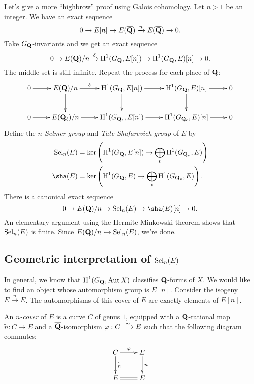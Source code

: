 Let's give a more ``highbrow'' proof using Galois cohomology. Let $n>1$ be an 
integer. We have an exact sequence 
\[
  0 \to E[n] \to E(\overline{\mathbf{Q}}) \xrightarrow n E(\overline{\mathbf{Q}}) \to 0 .
\]
Take $G_{\mathbf{Q}}$-invariants and we get an exact sequence 
\[
  0 \to E(\mathbf{Q})/n \xrightarrow\delta \operatorname{H}^1(G_{\mathbf{Q}},E[n]) \to \operatorname{H}^1(G_{\mathbf{Q}},E)[n] \to 0 .
\]
The middle set is still infinite. Repeat the process for each place  of $\mathbf{Q}$:
\[\xymatrix{
  0 \ar[r] 
    & E(\dQ)/n \ar[r]^-\delta \ar[d] 
    & \h^1(G_\dQ,E[n]) \ar[r] \ar[d] 
    & \h^1(G_\dQ,E)[n] \ar[r] \ar[d] 
    & 0 \\
  0 \ar[r] 
    & E(\dQ_\ell)/n \ar[r] 
    & \h^1(G_{\dQ_\ell},E[n]) \ar[r] 
    & \h^1(G_{\dQ_\ell},E)[n] \ar[r] 
    & 0 
}\]
Define the \emph{$n$-Selmer group} and \emph{Tate-Shafarevich group} of $E$ by 
\begin{align*}
  \selmer_n(E) 
    &= \ker\left(\h^1(G_\dQ,E[n]) \to \bigoplus_v \h^1(G_{\dQ_v},E)\right) \\
  \sha(E) 
    &= \ker\left(\h^1(G_\dQ,E) \to \bigoplus_v \h^1(G_{\dQ_v},E)\right) .
\end{align*}
There is a canonical exact sequence 
\[
  0 \to E(\dQ)/n \to \selmer_n(E) \to \sha(E)[n] \to 0 .
\]
An elementary argument using the Hermite-Minkowski theorem shows that 
$\operatorname{Sel}_n(E)$ is finite. Since $E(\mathbf{Q})/n\hookrightarrow \operatorname{Sel}_n(E)$, we're 
done. 





\subsection{Geometric interpretation of \texorpdfstring{$\operatorname{Sel}_n(E)$}{SelnE}}

In general, we know that $\operatorname{H}^1(G_{\mathbf{Q}},\operatorname{Aut} X)$ classifies 
$\mathbf{Q}$-forms of $X$. We would like to find an object whose automorphism group is 
$E[n]$. Consider the isogeny $E\xrightarrow n E$. The automorphisms of this 
cover of $E$ are exactly elements of $E[n]$. 

\begin{defi}
An \emph{$n$-cover} of $E$ is a curve $C$ of genus $1$, equipped with a 
$\mathbf{Q}$-rational map $\widetilde n:C\to E$ and a $\overline{\mathbf{Q}}$-isomorphism 
$\varphi:C\iso E$ such that the following diagram commutes: 
\[\xymatrix{
  C \ar[r]^-\varphi \ar[d]^-{\widetilde n} 
    & E \ar[d]^-n \\
  E \ar@{=}[r] 
    & E
}\]
\end{defi}

